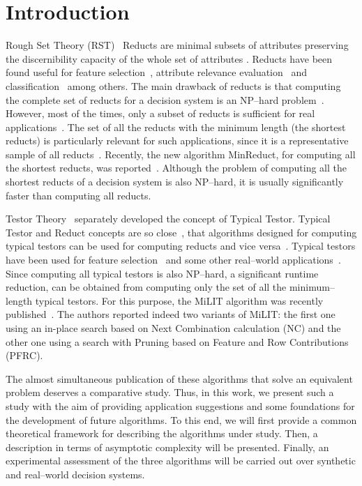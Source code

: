 \documentclass[citenumber]{llncs}
\begin{document}
\section{Introduction}
%
	Rough Set Theory (RST)~\cite{Pawlak82} Reducts are minimal subsets of attributes preserving the discernibility capacity of the whole set of attributes \cite{Pawlak91}. Reducts have been found useful for feature selection~\cite{Nguyen2016,Alwesabi2016}, attribute relevance evaluation~\cite{Inuiguchi2017} and classification~\cite{Ishii2018,Own2015} among others. The main drawback of reducts is that computing the complete set of reducts for a decision system is an NP--hard problem~\cite{Skowron92}. However, most of the times, only a subset of reducts is sufficient for real applications~\cite{Zheng14,Jiang15}. The set of all the reducts with the minimum length (the shortest reducts) is particularly relevant for such applications, since it is a representative sample of all reducts~\cite{Susmaga1998}. Recently, the new algorithm MinReduct, for computing all the shortest reducts, was reported~\cite{rodriguez20}. Although the problem of computing all the shortest reducts of a decision system is also NP--hard, it is usually significantly faster than computing all reducts.
	
	Testor Theory~\cite{Cheguis55} separately developed the concept of Typical Testor. Typical Testor and Reduct concepts are so close~\cite{Chikalov2013}, that algorithms designed for computing typical testors can be used for computing reducts and vice versa~\cite{Lazo15}. Typical testors have been used for feature selection~\cite{Dmitriev1966,Ruiz08} and some other real--world applications~\cite{Torres2014}. Since computing all typical testors is also NP--hard, a significant runtime reduction, can be obtained from computing only the set of all the minimum--length typical testors. For this purpose, the MiLIT algorithm was recently published~\cite{Piza20}. The authors reported indeed two variants of MiLIT: the first one using an in-place search based on Next
	Combination calculation (NC) and the other one using a search with Pruning based on Feature and
	Row Contributions (PFRC).
		
	The almost simultaneous publication of these algorithms that solve an equivalent problem deserves a comparative study. Thus, in this work, we present such a study with the aim of providing application suggestions and some foundations for the development of future algorithms. To this end, we will first provide a common theoretical framework for describing the algorithms under study. Then, a description in terms of asymptotic complexity will be presented. Finally, an experimental assessment of the three algorithms will be carried out over synthetic and real--world decision systems. 
	
\end{document}
